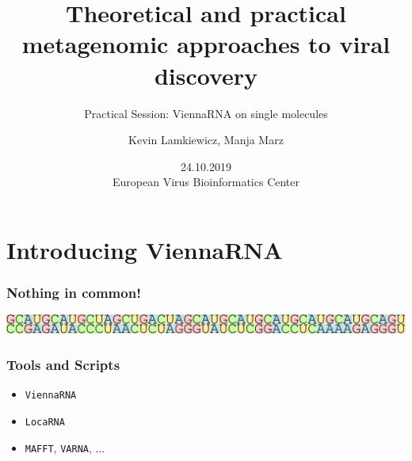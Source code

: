 

\title{Theoretical and practical metagenomic approaches to viral discovery}
\subtitle{Practical Session: ViennaRNA on single molecules}
\author{Kevin Lamkiewicz, Manja Marz}
\date{24.10.2019\\[1em]European Virus Bioinformatics Center}



\begin{frame}
  \maketitle
\end{frame}

\section[Intro]{Introducing ViennaRNA}

\begin{frame}[c]\frametitle{Nothing in common!}
  \begin{center}
      \includegraphics[width=1\textwidth]{figures/sequence_sim.pdf}
  \end{center}
\end{frame}

\begin{frame}[c]\frametitle{Tools and Scripts}
    
  \begin{itemize}
      \item<2-> \texttt{ViennaRNA}

      \item<3-> \texttt{LocaRNA}
      \item<4-> \texttt{MAFFT}, \texttt{VARNA}, $\dots$
  \end{itemize}
\end{frame}

